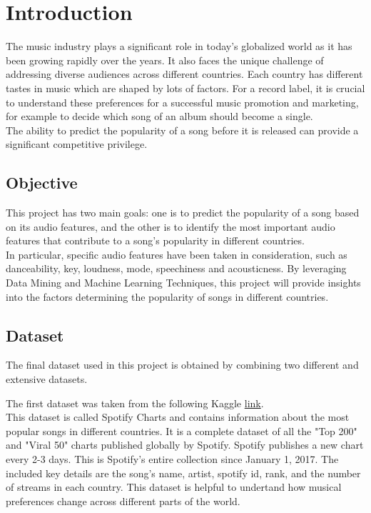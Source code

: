 \chapter{Introduction}

The music industry plays a significant role in today’s globalized world as it has been growing rapidly over the years. It also faces the unique challenge of addressing diverse audiences across
different countries. Each country has different tastes in music which are shaped
by lots of factors. For a record label, it is crucial to understand these preferences for a successful music promotion and marketing, for example to decide which song of an album should become a single.\\ The ability to predict
the popularity of a song before it is released can provide a significant 
competitive privilege.\\


\section{Objective}
This project has two main goals: one is to predict the popularity of a song based on its audio features, and the other is to identify the most important audio features that contribute to a song's popularity in different countries.\\
In particular, specific audio features have been taken in consideration,  
such as danceability, key, loudness, mode, speechiness and acousticness. 
By leveraging Data Mining and Machine Learning Techniques, this project will provide insights into
the factors determining the popularity of songs in different countries.\\

\section{Dataset}
The final dataset used in this project is obtained by combining two different and extensive datasets.

The first dataset was taken from the following Kaggle \href{https://www.kaggle.com/datasets/dhruvildave/spotify-charts/data} {link}. \\

This dataset is called Spotify Charts and contains information about the most popular songs in different countries. It is a complete dataset 
of all the "Top 200" and "Viral 50" charts published globally by Spotify. Spotify publishes a new chart
 every 2-3 days. This is Spotify's entire collection since January 1, 2017.
 The included key details are the song's name, artist, spotify id, rank, and the number of streams 
 in each country. This dataset is helpful to undertand how musical preferences change across different
 parts of the world. \\

